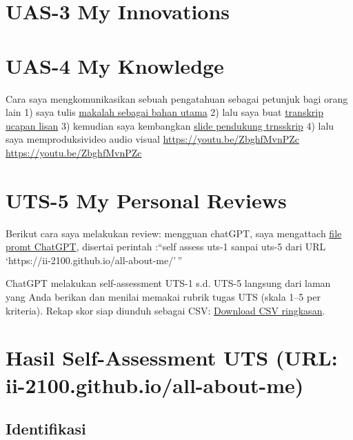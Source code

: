 \documentclass[
  letterpaper,
  DIV=11,
  numbers=noendperiod]{scrreprt}
\begin{document}

\chapter{UAS-3 My Innovations}\label{uas-3-my-innovations}


\chapter{UAS-4 My Knowledge}\label{uas-4-my-knowledge}

Cara saya mengkomunikasikan sebuah pengatahuan sebagai petunjuk bagi
orang lain 1) saya tulis
\href{Rekomendasi\%20Presentasi\%20Efektif(Contoh\%20Makalah).pdf}{makalah
sebagai bahan utama} 2) lalu saya buat
\href{Contoh\%20Transkrip\%20Presentasi.pdf}{transkrip ucapan lisan} 3)
kemudian saya kembangkan
\href{Rekomendasi\%20Presentasi\%20(Contoh\%20Slides).pdf}{slide
pendukung trnsskrip} 4) lalu saya memproduksivideo audio visual
\url{https://youtu.be/ZbghfMvnPZc} \url{https://youtu.be/ZbghfMvnPZc}


\chapter{UTS-5 My Personal Reviews}\label{uts-5-my-personal-reviews-1}

Berikut cara saya melakukan review: mengguan chatGPT, saya mengattach
\href{skor_uts.pdf}{file promt ChatGPT}, disertai perintah :``self
assess uts-1 sanpai uts-5 dari URL
`https://ii-2100.github.io/all-about-me/'\,''

ChatGPT melakukan self-assessment UTS-1 s.d. UTS-5 langsung dari laman
yang Anda berikan dan menilai memakai rubrik tugas UTS (skala 1--5 per
kriteria). Rekap skor siap diunduh sebagai CSV:
\href{sandbox:/mnt/data/UTS_self_assessment.csv}{Download CSV
ringkasan}.


\chapter{Hasil Self-Assessment UTS (URL:
ii-2100.github.io/all-about-me)}\label{hasil-self-assessment-uts-url-ii-2100.github.ioall-about-me-1}

\section{Identifikasi}\label{identifikasi}
\end{document}
